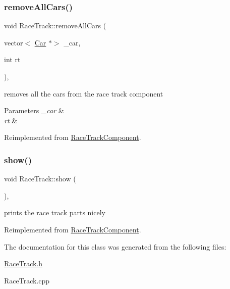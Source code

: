 \subsubsection{\texorpdfstring{remove\+All\+Cars()}{removeAllCars()}}
{\footnotesize\ttfamily void Race\+Track\+::remove\+All\+Cars (\begin{DoxyParamCaption}\item[{vector$<$ \mbox{\hyperlink{class_car}{Car}} $\ast$$>$}]{\+\_\+car,  }\item[{int}]{rt }\end{DoxyParamCaption})\hspace{0.3cm}{\ttfamily [inline]}, {\ttfamily [virtual]}}

removes all the cars from the race track component 
\begin{DoxyParams}{Parameters}
{\em \+\_\+car} & \\
\hline
{\em rt} & \\
\hline
\end{DoxyParams}


Reimplemented from \mbox{\hyperlink{class_race_track_component_a0d073a7d844143f5c4cebf2a2bb0cee7}{Race\+Track\+Component}}.

\mbox{\label{class_race_track_ad4d3cc9b17b4cf1173033dc2d0f7ffb5}} 
\subsubsection{\texorpdfstring{show()}{show()}}
{\footnotesize\ttfamily void Race\+Track\+::show (\begin{DoxyParamCaption}{ }\end{DoxyParamCaption})\hspace{0.3cm}{\ttfamily [inline]}, {\ttfamily [virtual]}}

prints the race track parts nicely 

Reimplemented from \mbox{\hyperlink{class_race_track_component_a109347e296fe7df389f157c01344a79a}{Race\+Track\+Component}}.



The documentation for this class was generated from the following files\+:\begin{DoxyCompactItemize}
\item 
\mbox{\hyperlink{_race_track_8h}{Race\+Track.\+h}}\item 
Race\+Track.\+cpp\end{DoxyCompactItemize}

